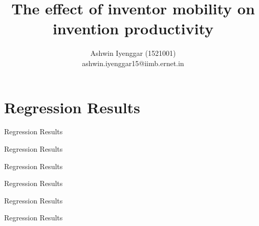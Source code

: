 \documentclass[12pt]{article}
\begin{document}
\title{The effect of inventor mobility on  invention productivity}
\author{Ashwin Iyenggar  (1521001) \\ ashwin.iyenggar15@iimb.ernet.in} 

\maketitle
\thispagestyle{empty}

\section{Regression Results}
\begin{table}
\caption{Regression Results}

\end{table}

\begin{table}
\caption{Regression Results}

\end{table}

\begin{table}
\caption{Regression Results}

\end{table}

\begin{table}
\caption{Regression Results}

\end{table}

\begin{table}
\caption{Regression Results}

\end{table}

\begin{table}
\caption{Regression Results}

\end{table}

 

\end{document}
